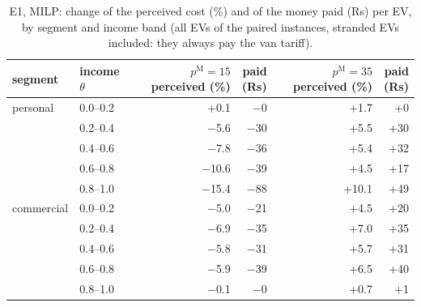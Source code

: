 \begin{table}[H]\centering
\scriptsize
\caption{E1, MILP: change of the perceived cost (\%) and of the money paid (Rs) per EV, by segment and income band (all EVs of the paired instances, stranded EVs included: they always pay the van tariff).}\label{tab:eqE1}
\begin{adjustbox}{max width=\textwidth}\begin{tabular}{llrrrr}\toprule
segment & income $\theta$ & \shortstack{$p^{\mathrm M}=15$\\perceived (\%)} & \shortstack{paid\\(Rs)} & \shortstack{$p^{\mathrm M}=35$\\perceived (\%)} & \shortstack{paid\\(Rs)} \\ \midrule
personal & 0.0--0.2 & +0.1 & $-$0 & +1.7 & +0 \\
 & 0.2--0.4 & $-$5.6 & $-$30 & +5.5 & +30 \\
 & 0.4--0.6 & $-$7.8 & $-$36 & +5.4 & +32 \\
 & 0.6--0.8 & $-$10.6 & $-$39 & +4.5 & +17 \\
 & 0.8--1.0 & $-$15.4 & $-$88 & +10.1 & +49 \\
commercial & 0.0--0.2 & $-$5.0 & $-$21 & +4.5 & +20 \\
 & 0.2--0.4 & $-$6.9 & $-$35 & +7.0 & +35 \\
 & 0.4--0.6 & $-$5.8 & $-$31 & +5.7 & +31 \\
 & 0.6--0.8 & $-$5.9 & $-$39 & +6.5 & +40 \\
 & 0.8--1.0 & $-$0.1 & $-$0 & +0.7 & +1 \\
\bottomrule\end{tabular}\end{adjustbox}\end{table}
